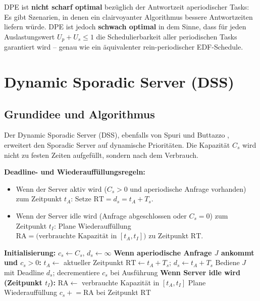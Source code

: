 ﻿\documentclass[a4paper,12pt]{report}
\theoremstyle{definition}
\begin{document}
DPE ist \textbf{nicht scharf optimal} bezüglich der Antwortzeit aperiodischer Tasks:
Es gibt Szenarien, in denen ein clairvoyanter Algorithmus bessere Antwortzeiten
liefern würde. DPE ist jedoch \textbf{schwach optimal} in dem Sinne, dass für jeden
Auslastungswert $U_p + U_s \leq 1$ die Schedulierbarkeit aller periodischen Tasks
garantiert wird -- genau wie ein äquivalenter rein-periodischer EDF-Schedule.

\section{Dynamic Sporadic Server (DSS)}

\subsection{Grundidee und Algorithmus}

Der Dynamic Sporadic Server (DSS), ebenfalls von Spuri und Buttazzo \cite{Spuri1996},
erweitert den Sporadic Server auf dynamische Prioritäten. Die Kapazität $C_s$ wird
nicht zu festen Zeiten aufgefüllt, sondern nach dem Verbrauch.

\textbf{Deadline- und Wiederauffüllungsregeln:}

\begin{itemize}
	\item Wenn der Server aktiv wird ($C_s > 0$ und aperiodische Anfrage vorhanden)
	      zum Zeitpunkt $t_A$: Setze $\mathrm{RT} = d_s = t_A + T_s$.
	\item Wenn der Server idle wird (Anfrage abgeschlossen oder $C_s = 0$)
	      zum Zeitpunkt $t_I$: Plane Wiederauffüllung $\mathrm{RA} = \text{(verbrauchte Kapazität in }[t_A, t_I])$ zu Zeitpunkt $\mathrm{RT}$.
\end{itemize}

\begin{algorithm}[H]
	\caption{DSS Server -- Kapazitätsverwaltung}
	\begin{algorithmic}[1]
		\State \textbf{Initialisierung:} $c_s \leftarrow C_s$, $d_s \leftarrow \infty$
		\State
		\State \textbf{Wenn aperiodische Anfrage $J$ ankommt und $c_s > 0$:}
		\State $t_A \leftarrow$ aktueller Zeitpunkt
		\State $\mathrm{RT} \leftarrow t_A + T_s$; $d_s \leftarrow t_A + T_s$
		\State Bediene $J$ mit Deadline $d_s$; decrementiere $c_s$ bei Ausführung
		\State
		\State \textbf{Wenn Server idle wird (Zeitpunkt $t_I$):}
		\State $\mathrm{RA} \leftarrow$ verbrauchte Kapazität in $[t_A, t_I]$
		\State Plane Wiederauffüllung $c_s \mathrel{+}= \mathrm{RA}$ bei Zeitpunkt $\mathrm{RT}$
	\end{algorithmic}
\end{algorithm}
\end{document}

